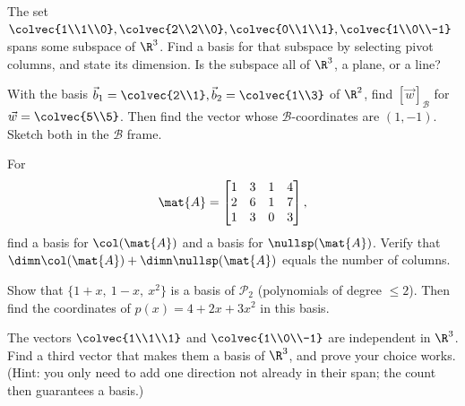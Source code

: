 \begin{exercise}
\label{ch14:exr-trim}
The set $\colvec{1\\1\\0},\colvec{2\\2\\0},\colvec{0\\1\\1},\colvec{1\\0\\-1}$
spans some subspace of $\R^3$. Find a basis for that subspace by selecting pivot
columns, and state its dimension. Is the subspace all of $\R^3$, a plane, or a
line?
\end{exercise}

\begin{exercise}[Coordinates]
\label{ch14:exr-coords}
With the basis $\vec{b}_1=\colvec{2\\1},\vec{b}_2=\colvec{1\\3}$ of $\R^2$, find
$[\vec{w}]_{\mathcal B}$ for $\vec{w}=\colvec{5\\5}$. Then find the vector whose
$\mathcal B$-coordinates are $(1,-1)$. Sketch both in the $\mathcal B$ frame.
\end{exercise}

\begin{exercise}
\label{ch14:exr-both}
For
\[
  \mat{A}=\begin{bmatrix} 1 & 3 & 1 & 4\\ 2 & 6 & 1 & 7\\ 1 & 3 & 0 & 3\end{bmatrix},
\]
find a basis for $\col(\mat{A})$ and a basis for $\nullsp(\mat{A})$. Verify that
$\dimn\col(\mat{A}) + \dimn\nullsp(\mat{A})$ equals the number of columns.
\end{exercise}

\begin{exercise}
\label{ch14:exr-poly}
Show that $\{1+x,\ 1-x,\ x^2\}$ is a basis of $\mathcal P_2$ (polynomials of
degree $\le 2$). Then find the coordinates of $p(x) = 4 + 2x + 3x^2$ in this
basis.
\end{exercise}

\begin{exercise}
\label{ch14:exr-extend}
The vectors $\colvec{1\\1\\1}$ and $\colvec{1\\0\\-1}$ are independent in $\R^3$.
Find a third vector that makes them a basis of $\R^3$, and prove your choice
works. (Hint: you only need to add one direction not already in their span; the
count then guarantees a basis.)
\end{exercise}

